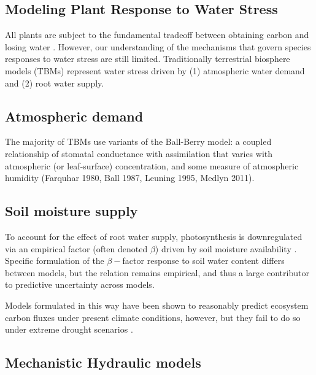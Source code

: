 \subsection*{Modeling Plant Response to Water Stress}

All plants are subject to the fundamental tradeoff between obtaining carbon and losing water \citep{bonan_2014}. However, our understanding of the mechanisms that govern species responses to water stress are still limited. Traditionally terrestrial biosphere models (TBMs) represent water stress driven by (1) atmospheric water demand and (2) root water supply.

{}
\subsection*{Atmospheric demand}

The majority of TBMs use variants of the Ball-Berry model: a coupled relationship of stomatal conductance with  assimilation that varies with atmospheric (or leaf-surface)  concentration, and some measure of atmospheric humidity (Farquhar 1980, Ball 1987, Leuning 1995, Medlyn 2011). 

\subsection*{Soil moisture supply}

To account for the effect of root water supply, photosynthesis is downregulated via an empirical factor (often denoted $\beta$) driven by soil moisture availability \citep{rogers_2017}. Specific formulation of the $\beta-$factor response to soil water content differs between models, but the relation remains empirical, and thus a large contributor to predictive uncertainty across models.
 
Models formulated in this way have been shown to reasonably predict ecosystem carbon fluxes under present climate conditions, however, but they fail to do so under extreme drought scenarios \citep{powell_2013, zhang_2015, paschalis_2020}.

\subsection*{Mechanistic Hydraulic models}

